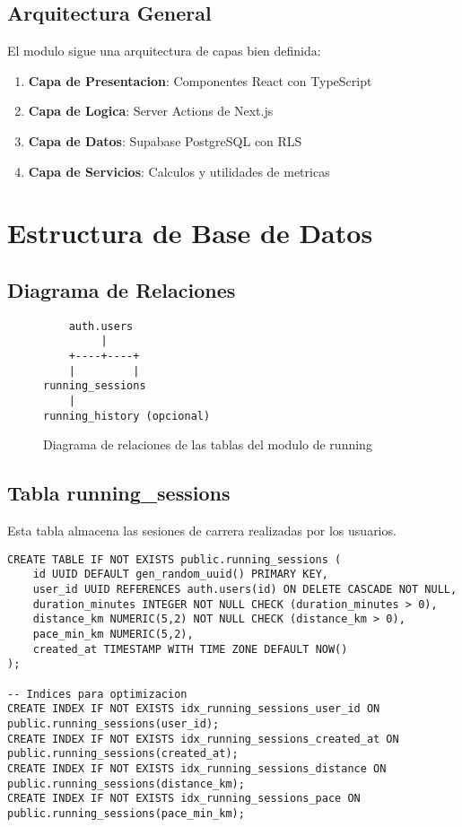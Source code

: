 \documentclass[12pt,a4paper]{article}
\begin{document}
\subsection{Arquitectura General}

El modulo sigue una arquitectura de capas bien definida:

\begin{enumerate}
    \item \textbf{Capa de Presentacion}: Componentes React con TypeScript
    \item \textbf{Capa de Logica}: Server Actions de Next.js
    \item \textbf{Capa de Datos}: Supabase PostgreSQL con RLS
    \item \textbf{Capa de Servicios}: Calculos y utilidades de metricas
\end{enumerate}

\section{Estructura de Base de Datos}

\subsection{Diagrama de Relaciones}

\begin{figure}[H]
\centering
\begin{verbatim}
    auth.users
         |
    +----+----+
    |         |
running_sessions
    |
running_history (opcional)
\end{verbatim}
\caption{Diagrama de relaciones de las tablas del modulo de running}
\end{figure}

\subsection{Tabla running\_sessions}

Esta tabla almacena las sesiones de carrera realizadas por los usuarios.

\begin{lstlisting}[style=sqlstyle, caption=Estructura completa de running_sessions]
CREATE TABLE IF NOT EXISTS public.running_sessions (
    id UUID DEFAULT gen_random_uuid() PRIMARY KEY,
    user_id UUID REFERENCES auth.users(id) ON DELETE CASCADE NOT NULL,
    duration_minutes INTEGER NOT NULL CHECK (duration_minutes > 0),
    distance_km NUMERIC(5,2) NOT NULL CHECK (distance_km > 0),
    pace_min_km NUMERIC(5,2),
    created_at TIMESTAMP WITH TIME ZONE DEFAULT NOW()
);

-- Indices para optimizacion
CREATE INDEX IF NOT EXISTS idx_running_sessions_user_id ON public.running_sessions(user_id);
CREATE INDEX IF NOT EXISTS idx_running_sessions_created_at ON public.running_sessions(created_at);
CREATE INDEX IF NOT EXISTS idx_running_sessions_distance ON public.running_sessions(distance_km);
CREATE INDEX IF NOT EXISTS idx_running_sessions_pace ON public.running_sessions(pace_min_km);
\end{lstlisting}
\end{document}
